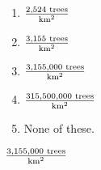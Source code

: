 \ifactodd
	\begin{enumerate}[label=\textbf{\Alph*.},itemsep=\fill,align=left]
		\item $\frac{2,524\rule{1mm}{0mm}\mathrm{trees}}{\rule{0mm}{2.2mm}\mathrm{km}^2}$ 
		\item $\frac{3,155\rule{1mm}{0mm}\mathrm{trees}}{\rule{0mm}{2.2mm}\mathrm{km}^2}$ 
		\item $\frac{3,155,000\rule{1mm}{0mm}\mathrm{trees}}{\rule{0mm}{2.2mm}\mathrm{km}^2}$ %
		\item $\frac{315,500,000\rule{1mm}{0mm}\mathrm{trees}}{\rule{0mm}{2.2mm}\mathrm{km}^2}$
		\item None of these. 
	\end{enumerate}
\else
\fi

\ifgridin
 $\frac{3,155,000\rule{1mm}{0mm}\mathrm{trees}}{\rule{0mm}{2.2mm}\mathrm{km}^2}$ %
		
\else
\fi

